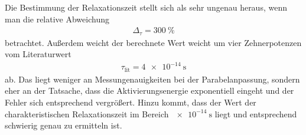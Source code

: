 Die Bestimmung der Relaxationszeit stellt sich als sehr ungenau heraus, wenn man die relative Abweichung
\begin{align}
  \Delta_{\tau} = \SI{300}{\percent}
\end{align}
betrachtet. Außerdem weicht der berechnete Wert weicht um vier Zehnerpotenzen vom Literaturwert \cite{paper}
\begin{align}
  \tau_\text{lit} = \SI{4 e-14}{\second}
\end{align}
ab. Das liegt weniger an Messungenauigkeiten bei der Parabelanpassung, sondern eher an der Tatsache, dass
die Aktivierungsenergie exponentiell eingeht und der Fehler sich entsprechend vergrößert. Hinzu kommt, dass
der Wert der charakteristischen Relaxationszeit im Bereich $\SI{e-14}{\second}$ liegt und entsprechend
schwierig genau zu ermitteln ist.
